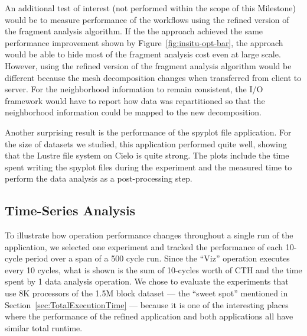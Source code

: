 An additional test of interest (not performed within the scope of this
Milestone) would be to measure performance of the \intransit workflows
using the refined version of the fragment analysis algorithm.  If the the
\intransit approach achieved the same performance improvement shown by
Figure~\ref{fig:insitu-opt-bar}, the \intransit approach would be able to
hide most of the fragment analysis cost even at large scale.  However,
using the refined version of the fragment analysis algorithm would be
different because the mesh decomposition changes when transferred from
client to server.  For the neighborhood information to remain consistent,
the I/O framework would have to report how data was repartitioned so that
the neighborhood information could be mapped to the new decomposition.

Another surprising result is the performance of the spyplot file application.
For the size of datasets we studied, this application performed quite well, showing that
the Lustre file system on Cielo is quite strong.  The plots include the time
spent writing the spyplot files during the experiment and the measured time to
perform the data analysis as a post-processing step.



\FloatBarrier

\subsection{Time-Series Analysis}

To illustrate how operation performance changes throughout a single run
of the application, we selected one experiment and tracked the performance of
each 10-cycle period over a span of a 500 cycle run.  Since the ``Viz''
operation executes every 10 cycles, what is shown is the sum of 10-cycles worth
of CTH and the time spent by 1 data analysis operation. We chose to evaluate
the experiments that use 8K processors of the 1.5M block dataset --- the ``sweet
spot'' mentioned in Section~\ref{sec:TotalExecutionTime} --- because it is one of
the interesting places where the performance of the refined \insitu application
and both \intransit applications all have similar total runtime.

